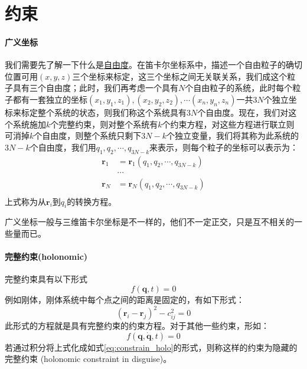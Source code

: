 \section{约束}
\paragraph*{广义坐标}
我们需要先了解一下什么是\underline{自由度}。在笛卡尔坐标系中，描述一个自由粒子的确切位置可用$(x,y,z)$三个坐标来标定，这三个坐标之间无关联关系，我们成这个粒子具有三个自由度；此时，我们再考虑一个具有$N$个自由粒子的系统，此时每个粒子都有一套独立的坐标$(x_1, y_1, z_1), (x_2, y_2, z_2), \cdots (x_n, y_n, z_n)$一共$3N$个独立坐标来标定整个系统的状态，则我们称这个系统具有$3N$个自由度。现在，我们对这个系统施加$k$个完整约束，则对整个系统有$k$个约束方程，对这些方程进行联立则可消掉$k$个自由度，则整个系统只剩下$3N-k$个独立变量，我们将其称为此系统的$3N-k$个自由度，我们用$q_1, q_2, \cdots, q_{3N-k}$来表示，则每个粒子的坐标可以表示为：
\begin{equation*}
	\begin{aligned}
		\bm{r}_1 &= \bm{r}_1(q_1, q_2, \cdots, q_{3N-k})	\\
					   &\cdots	\\
		\bm{r}_N &= \bm{r}_N(q_1, q_2, \cdots, q_{3N-k})	\\
	\end{aligned}
\end{equation*} 
上式称为从$\bm{r}_i$到$q_i$的转换方程。
\begin{note}
	广义坐标一般与三维笛卡尔坐标是不一样的，他们不一定正交，只是互不相关的一些量而已。	
\end{note}

\paragraph*{完整约束(holonomic)}
完整约束具有以下形式
\begin{equation}
    f(\bm{q}, t) = 0	\label{eq:constrain_holo}
\end{equation} 
例如刚体，刚体系统中每个点之间的距离是固定的，有如下形式：
\begin{equation*}
    (\bm{r}_i - \bm{r}_j)^2 - c_{ij}^2 = 0
\end{equation*} 
此形式的方程就是具有完整约束的约束方程。对于其他一些约束，形如：
\begin{equation}
    f(\bm{q}, \dot{\bm{q}}, t) = 0
    \label{eq:eq:constrain-holo-disg}
\end{equation}
若通过积分将上式化成如式\eqref{eq:constrain_holo}的形式，则称这样的约束为隐藏的完整约束
(holonomic constraint in disguise)。

